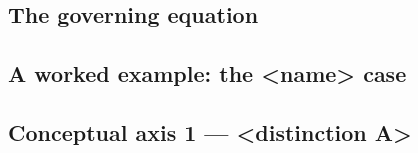 \documentclass[12pt,a4paper]{article}
\begin{document}
\subsection{The governing equation}
\label{sec:the-governing-equation}
%

\subsection{\texorpdfstring{A worked example: the <name> case}{A worked example: the <name> case}}
\label{sec:this-model-solved-by-hand}
%

\subsection{\texorpdfstring{Conceptual axis 1 --- <distinction A>}{Conceptual axis 1 -- <distinction A>}}
\label{sec:conceptual-axis-1}
%
\end{document}
